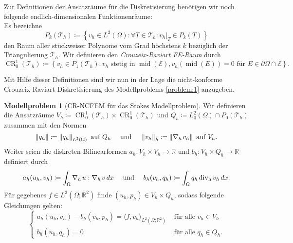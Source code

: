\documentclass[a4paper]{scrartcl}
\newcommand{\real}{\mathbb{R}}
\newcommand{\Ltwo}{L^2}
\newcommand{\crfem}{\operatorname{CR}_0^1}
\newcommand{\mesh}{\mathcal{T}_h}
\newcommand{\edges}{\mathcal{E}}
\newcommand{\dx}{\,dx}
\newcommand{\norm}[1]{\left\lVert#1\right\rVert}
\newcommand{\hnorm}[1]{\left\lVert#1\right\rVert_h}
\newcommand{\set}[1]{\left\{#1\right\}}
\DeclareMathOperator{\divh}{div_h}
\DeclareMathOperator{\nablah}{\nabla_{\emph{h}}}
\DeclareMathOperator{\midOp}{mid}
\theoremstyle{plain}
\theoremstyle{definition}
\newtheorem{modellproblem}{Modellproblem}
\theoremstyle{remark}
\begin{document}
\noindent Zur Definitionen der Ansatzräume für die Diskretisierung
benötigen wir noch folgende endlich-dimensionalen Funktionenräume: \\
Es bezeichne 
\[P_k(\mesh) \coloneqq \set{v_h \in \Ltwo(\Omega)\colon \forall T \in
  \mesh\colon v_h|_T \in P_k(T)}\]
den Raum aller stückweiser Polynome vom Grad höchstens \(k\) bezüglich
der Triangulierung \(\mesh\). Wir definieren den \emph{Crouzeix-Raviart
FE-Raum} durch 
\begin{equation}
  \label{eq:9}
  \crfem(\mesh) \coloneqq \set{v_h \in P_1(\mesh)\colon v_h \text{ stetig in } \midOp(\edges), v_h(\midOp(E)) = 0 \text{ für } E \in \partial\Omega\cap\edges}.
\end{equation}

\noindent Mit Hilfe dieser Definitionen sind wir nun in der Lage die
nicht-konforme Crouzeix-Raviart Diskretisierung des Modellproblems
\ref{problem:1} anzugeben. 

\begin{modellproblem}[CR-NCFEM für das Stokes
  Modellproblem] \label{problem:3}
  Wir definieren die Ansatzräume \(V_h \coloneqq \crfem(\mesh) \times
  \crfem(\mesh)\) und \(Q_h \coloneqq \Ltwo_0(\Omega) \cap
  P_0(\mesh)\) zusammen mit den Normen 
  \begin{equation}
    \label{eq:10}
    \norm{q_h} \coloneqq \norm{q_h}_{\Ltwo(\Omega)} \text{ auf } Q_h
    \quad \text{ und } \quad
    \hnorm{v_h} \coloneqq \norm{\nablah v_h} \text{ auf } V_h. 
  \end{equation}
  Weiter seien die diskreten Bilinearformen \(a_h\colon V_h \times V_h
  \rightarrow \real\) und \(b_h\colon V_h \times Q_h \rightarrow
  \real\) definiert durch
  \begin{equation}
    \label{eq:11}
    a_h(u_h, v_h) \coloneqq \int_\Omega \nablah u : \nablah v \dx
    \quad \text{ und } \quad b_h(v_h, q_h) \coloneqq \int_\Omega q_h\divh v_h \dx. 
  \end{equation}
  Für gegebenes \(f \in \Ltwo(\Omega; \real^2)\) finde \((u_h, p_h)
  \in V_h \times Q_h\), sodass folgende Gleichungen gelten: 
  \begin{equation}
    \label{eq:12}
    \begin{cases}
      a_h(u_h, v_h) - b_h(v_h, p_h) = \langle f, v_h \rangle_{\Ltwo(\Omega; \real^2)} & \text{ für alle } v_h \in V_h \\
      b_h(u_h, q_h) = 0 & \text{ für alle } q_h \in Q_h. 
    \end{cases}
  \end{equation}
  \end{modellproblem}
\end{document}
